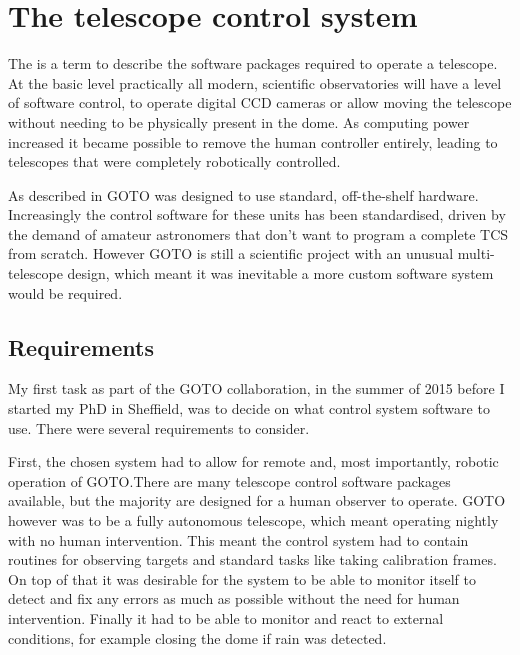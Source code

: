 \section{The telescope control system}
\label{sec:control_systems}
\begin{colsection}


\begin{colsection}

The  is a term to describe the software packages required to operate a telescope. At the basic level practically all modern, scientific observatories will have a level of software control, to operate digital CCD cameras or allow moving the telescope without needing to be physically present in the dome. As computing power increased it became possible to remove the human controller entirely, leading to telescopes that were completely robotically controlled.

As described in  GOTO was designed to use standard, off-the-shelf hardware. Increasingly the control software for these units has been standardised, driven by the demand of amateur astronomers that don't want to program a complete TCS from scratch. However GOTO is still a scientific project with an unusual multi-telescope design, which meant it was inevitable a more custom software system would be required.

\end{colsection}


\subsection{Requirements}
\label{sec:control_requirements}
\begin{colsection}

My first task as part of the GOTO collaboration, in the summer of 2015 before I started my PhD in Sheffield, was to decide on what control system software to use. There were several requirements to consider.

First, the chosen system had to allow for remote and, most importantly, robotic operation of GOTO.\@ There are many telescope control software packages available, but the majority are designed for a human observer to operate. GOTO however was to be a fully autonomous telescope, which meant operating nightly with no human intervention. This meant the control system had to contain routines for observing targets and standard tasks like taking calibration frames. On top of that it was desirable for the system to be able to monitor itself to detect and fix any errors as much as possible without the need for human intervention. Finally it had to be able to monitor and react to external conditions, for example closing the dome if rain was detected.


\end{colsection}
\end{colsection}
